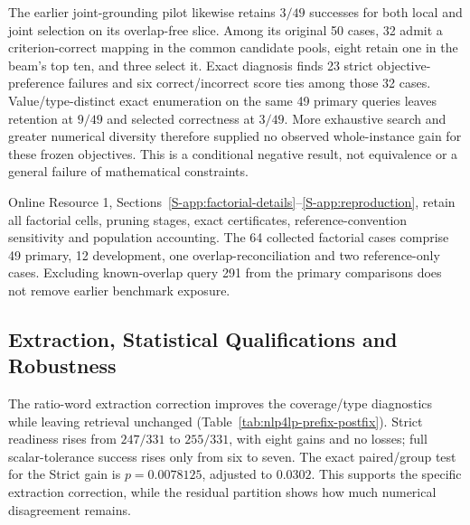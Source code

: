 \documentclass[pdflatex,iicol,sn-basic,Numbered]{sn-jnl}
\begin{document}
The earlier joint-grounding pilot likewise retains $3/49$ successes for both local and joint selection on its overlap-free slice. Among its original 50 cases, 32 admit a criterion-correct mapping in the common candidate pools, eight retain one in the beam's top ten, and three select it. Exact diagnosis finds 23 strict objective-preference failures and six correct/incorrect score ties among those 32 cases. Value/type-distinct exact enumeration on the same 49 primary queries leaves retention at $9/49$ and selected correctness at $3/49$. More exhaustive search and greater numerical diversity therefore supplied no observed whole-instance gain for these frozen objectives. This is a conditional negative result, not equivalence or a general failure of mathematical constraints.

Online Resource 1, Sections~\ref{S-app:factorial-details}--\ref{S-app:reproduction}, retain all factorial cells, pruning stages, exact certificates, reference-convention sensitivity and population accounting. The 64 collected factorial cases comprise 49 primary, 12 development, one overlap-reconciliation and two reference-only cases. Excluding known-overlap query 291 from the primary comparisons does not remove earlier benchmark exposure.


\subsection{Extraction, Statistical Qualifications and Robustness}
\label{subsec:exp_significance}
The ratio-word extraction correction improves the coverage/type diagnostics while leaving retrieval unchanged (Table~\ref{tab:nlp4lp-prefix-postfix}). Strict readiness rises from $247/331$ to $255/331$, with eight gains and no losses; full scalar-tolerance success rises only from six to seven. The exact paired/group test for the Strict gain is $p=0.0078125$, adjusted to $0.0302$. This supports the specific extraction correction, while the residual partition shows how much numerical disagreement remains.
\end{document}
